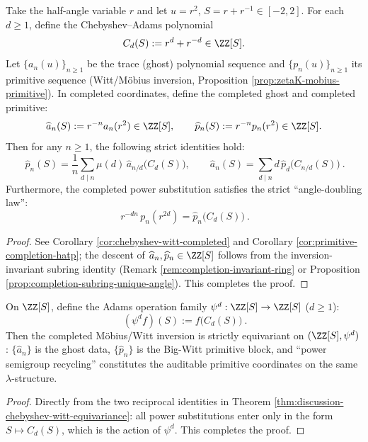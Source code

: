 \begin{theorem}\label{thm:discussion-chebyshev-witt-equivariance}
Take the half-angle variable \(r\) and let \(u=r^2\), \(S=r+r^{-1}\in[-2,2]\).
For each \(d\ge 1\), define the Chebyshev--Adams polynomial
\[
C_d(S):=r^d+r^{-d}\in\ZZ[S].
\]
Let \(\{a_n(u)\}_{n\ge 1}\) be the trace (ghost) polynomial sequence and \(\{p_n(u)\}_{n\ge 1}\) its primitive sequence (Witt/M\"obius inversion, Proposition \ref{prop:zetaK-mobius-primitive}).
In completed coordinates, define the completed ghost and completed primitive:
\[
\widehat a_n(S):=r^{-n}a_n(r^2)\in\ZZ[S],\qquad
\widehat p_n(S):=r^{-n}p_n(r^2)\in\ZZ[S].
\]
Then for any \(n\ge 1\), the following strict identities hold:
\[
\boxed{\
\widehat p_n(S)=\frac1n\sum_{d\mid n}\mu(d)\,\widehat a_{n/d}\!\bigl(C_d(S)\bigr),
\qquad
\widehat a_n(S)=\sum_{d\mid n}d\,\widehat p_d\!\bigl(C_{n/d}(S)\bigr)\ }.
\]
Furthermore, the completed power substitution satisfies the strict ``angle-doubling law'':
\[
\boxed{\ r^{-dn}\,p_n(r^{2d})=\widehat p_n\!\bigl(C_d(S)\bigr)\ }.
\]
\end{theorem}

\begin{proof}
See Corollary \ref{cor:chebyshev-witt-completed} and Corollary \ref{cor:primitive-completion-hatp}; the descent of \(\widehat a_n,\widehat p_n\in\ZZ[S]\) follows from the inversion-invariant subring identity (Remark \ref{rem:completion-invariant-ring} or Proposition \ref{prop:completion-subring-unique-angle}). This completes the proof.
\end{proof}

\begin{corollary}\label{cor:discussion-lambda-equivariant-primitive}
On \(\ZZ[S]\), define the Adams operation family \(\psi^d:\ZZ[S]\to\ZZ[S]\) (\(d\ge 1\)):
\[
\boxed{\ (\psi^d f)(S):=f\!\bigl(C_d(S)\bigr)\ }.
\]
Then the completed M\"obius/Witt inversion is strictly equivariant on \((\ZZ[S],\psi^d)\): \(\{\widehat a_n\}\) is the ghost data, \(\{\widehat p_n\}\) is the Big-Witt primitive block, and ``power semigroup recycling'' constitutes the auditable primitive coordinates on the same \(\lambda\)-structure.
\end{corollary}

\begin{proof}
Directly from the two reciprocal identities in Theorem \ref{thm:discussion-chebyshev-witt-equivariance}: all power substitutions enter only in the form \(S\mapsto C_d(S)\), which is the action of \(\psi^d\). This completes the proof.
\end{proof}

